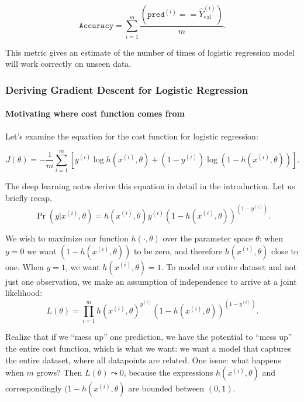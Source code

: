 \documentclass[12pt]{article}
\begin{document}
\begin{equation*}
\texttt{Accuracy} = \sum_{i=1}^m \frac{\left(\texttt{pred}^{(i)} == \hat Y_{\textrm{val}}^{(i)}\right)}{m}.
\end{equation*}

This metric gives an estimate of the number of times of logistic regression model will work correctly on unseen data.

\subsubsection{Deriving Gradient Descent for Logistic Regression}
\paragraph{Motivating where cost function comes from} Let's examine the equation for the cost function for logistic regression:

\begin{equation}
  \label{eq: crossentropyloss}
  J(\theta) = -\frac{1}{m} \sum_{i=1}^{m} \left[ y^{(i)} \log h(x^{(i)}, \theta) + (1 - y^{(i)}) \log \left(1 - h(x^{(i)}, \theta)\right)\right].
\end{equation}

The deep learning notes derive this equation in detail in the introduction. Let us briefly recap.
\[
  \Pr(y | x^{(i)}, \theta) = h(x^{(i)}, \theta)y^{(i)}\left(1 - h(x^{(i)}, \theta)\right)^{(1-y^{(i)})}.
\]

We wish to maximize our function $h(\cdot, \theta)$ over the parameter space $\theta$: when $y=0$ we want $(1 - h(x^{(i)}, \theta))$ to be zero, and therefore $h(x^{(i)}, \theta)$ close to one. When $y=1$, we want $h(x^{(i)},\theta) = 1$. To model our entire dataset and not just one observation, we make an assumption of independence to arrive at a joint likelihood:
\[
  L(\theta) = \prod_{i=1}^m h(x^{(i)}, \theta)^{y^{(i)}} \left(1 - h(x^{(i)}, \theta)\right)^{(1 - y^{(i)})}.
\]

Realize that if we ``mess up'' one prediction, we have the potential to ``mess up'' the entire cost function, which is what we want: we want a model that captures the entire dataset, where all datapoints are related. One issue: what happens when $m$ grows? Then $L(\theta) \leadsto 0$, because the expressions
$h(x^{(i)}, \theta)$ and correspondingly $(1 - h(x^{(i)}, \theta)$ are bounded between $(0,1)$.
\end{document}
